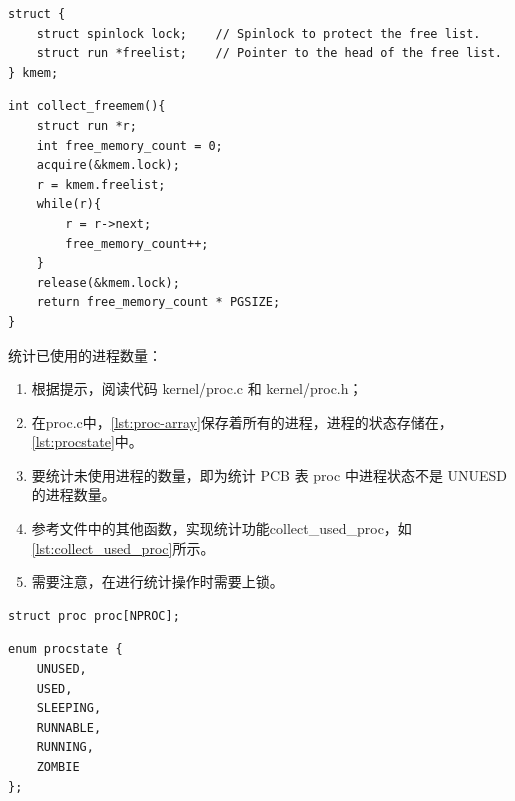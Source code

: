 \begin{listing}[!htb]
	\begin{verbatim}
struct {
	struct spinlock lock;    // Spinlock to protect the free list.
	struct run *freelist;    // Pointer to the head of the free list.
} kmem;
	\end{verbatim}
	\caption{物理内存分配器定义}\label{lst:kmem}
\end{listing}

\begin{listing}[!htb]
	\begin{verbatim}
int collect_freemem(){
    struct run *r;
    int free_memory_count = 0;
    acquire(&kmem.lock);
    r = kmem.freelist;
    while(r){
        r = r->next;
        free_memory_count++;
    }
    release(&kmem.lock);
    return free_memory_count * PGSIZE;
}
	\end{verbatim}
	\caption{统计可用的内存空间大小}\label{lst:collect_freemem}
\end{listing}

统计已使用的进程数量：

\begin{enumerate}
	\item 根据提示，阅读代码 kernel/proc.c 和 kernel/proc.h；
	\item 在proc.c中，\cref{lst:proc-array}保存着所有的进程，进程的状态存储在，\cref{lst:procstate}中。
	\item 要统计未使用进程的数量，即为统计 PCB 表 proc 中进程状态不是 UNUESD 的进程数量。
	\item 参考文件中的其他函数，实现统计功能collect\_used\_proc，如\cref{lst:collect_used_proc}所示。
	\item 需要注意，在进行统计操作时需要上锁。
\end{enumerate}

\begin{listing}[!htb]
	\begin{verbatim}
struct proc proc[NPROC]; 
	\end{verbatim}
	\caption{PCB表的定义}\label{lst:proc_array}
\end{listing}

\begin{listing}[!htb]
	\begin{verbatim}
enum procstate {
    UNUSED, 
    USED, 
    SLEEPING, 
    RUNNABLE, 
    RUNNING, 
    ZOMBIE 
};
	\end{verbatim}
	\caption{进程的状态定义}\label{lst:procstate}
\end{listing}


